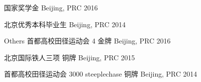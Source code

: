 \begin{cvhonors}
\cvhonor
{} %
{国家奖学金} %
{Beijing, PRC} %
{2016} %

\cvhonor
{} %
{北京优秀本科毕业生} %
{Beijing, PRC} %
{2014} %


\cvhonor
{Others} %
{首都高校田径运动会 4 金牌} %
{Beijing, PRC} %
{2016} %

\cvhonor
{} %
{北京国际铁人三项 铜牌} %
{Beijing, PRC} %
{2015} %

\cvhonor
{} %
{首都高校田径运动会 3000 steeplechase 铜牌} %
{Beijing, PRC} %
{2014} %


\end{cvhonors}
